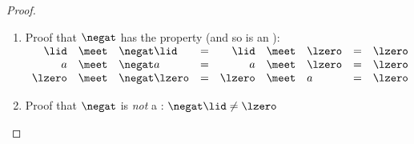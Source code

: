 \begin{proof}
\begin{enumerate}
  \item Proof that $\negat$ has the  property (and so is an ):
    \\$\begin{array}[t]{rcl c rcl c c}
      \lid   &\meet& \negat\lid   &=& \lid   &\meet&\lzero   &=& \lzero\\
      a      &\meet& \negat a      &=& a      &\meet&\lzero   &=& \lzero\\
      \lzero &\meet& \negat\lzero &=& \lzero &\meet&a        &=& \lzero
    \end{array}$

  \item Proof that $\negat$ is \emph{not} a : $\negat\lid\neq\lzero$
\end{enumerate}
\end{proof}

